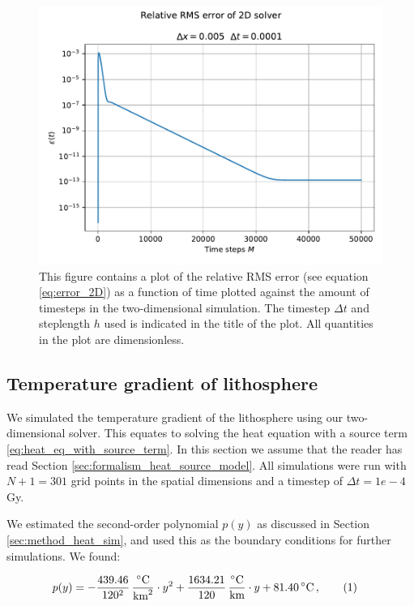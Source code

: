 \documentclass[reprint,english,notitlepage]{revtex4-1}  %
\newcommand\numberthis{\addtocounter{equation}{1}\tag{\theequation}}
\begin{document}
\begin{figure}[H]
\centering
\includegraphics[width=\columnwidth]{../data/2Derr.pdf}
\caption{This figure contains a plot of the relative RMS error (see equation \eqref{eq:error_2D}) as a function of time plotted against the amount of timesteps in the two-dimensional simulation. The timestep $\Delta t$ and steplength $h$ used is indicated in the title of the plot. All quantities in the plot are dimensionless.} \label{fig:error_2D}
\end{figure}

\subsection{Temperature gradient of lithosphere} \label{sec:results_lithosphere}

We simulated the temperature gradient of the lithosphere using our two-dimensional solver. This equates to solving the heat equation with a source term \eqref{eq:heat_eq_with_source_term}. In this section we assume that the reader has read Section \ref{sec:formalism_heat_source_model}. All simulations were run with $N+1 = 301$ grid points in the spatial dimensions and a timestep of $\Delta t = 1e-4$ Gy. 

We estimated the second-order polynomial $p(y)$ as discussed in Section \ref{sec:method_heat_sim}, and used this as the boundary conditions for further simulations. We found:

\begin{align*}
p(y) &= -\frac{439.46}{120^2} \, \frac{^\circ\text{C}}{\text{km}^2} \cdot y^2 + \frac{1634.21}{120} \, \frac{^\circ\text{C}}{\text{km}} \cdot y + 81.40 \, ^\circ\text{C} \, , \numberthis \label{eq:lithosphere_boundary_estimate}
\end{align*}
\end{document}
